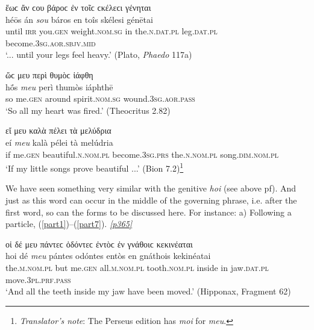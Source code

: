\begin{exe}
\ex ἕωϲ ἄν ϲου βάροϲ ἐν τοῖϲ ϲκέλεϲι γένηται\\
\gll héōs án \emph{sou} báros en toîs skélesi génētai\\
until \textsc{irr} you.\textsc{gen} weight.\textsc{nom.sg} in the.\textsc{n.dat.pl} leg.\textsc{dat.pl} become.\textsc{3sg.aor.sbjv.mid}\\
\trans `... until your legs feel heavy.' (Plato, \textit{Phaedo} 117a)
\label{gensep25}
\end{exe}

\begin{exe}
\ex ὥϲ μευ περὶ θυμὸϲ ἰάφθη\\
\gll hṓs \emph{meu} perì thumòs iáphthē\\
so me.\textsc{gen} around spirit.\textsc{nom.sg} wound.\textsc{3sg.aor.pass}\\
\trans `So all my heart was fired.' (Theocritus 2.82)
\label{gensep26}
\end{exe}

\begin{exe}
\ex εἴ μευ καλὰ πέλει τὰ μελύδρια\\
\gll eí \emph{meu} kalà pélei tà melúdria\\
if me.\textsc{gen} beautiful.\textsc{n.nom.pl} become.\textsc{3sg.prs}
the.\textsc{n.nom.pl} song.\textsc{dim.nom.pl}\\
\trans `If my little songs prove beautiful ...' (Bion 7.2)\footnote{\emph{Translator's note}: The Perseus edition has \textit{moi} for \textit{meu}.}
\label{gensep27}
\end{exe}

We have seen something very similar with the genitive \textit{hoi} (see above p\pageref{oi}f). And just as this word can occur in the middle of the governing phrase, i.e. after the first word, so can the forms to be discussed here. For instance: a) Following a particle, (\ref{part1})--(\ref{part7}). \hyperlink{p365}{\emph{[p365]}}

\begin{exe}
\ex οἱ δέ μευ πάντεϲ ὀδόντεϲ ἐντὸϲ ἐν γνάθοιϲ κεκινέαται\\
\gll hoi dé \emph{meu} pántes odóntes entòs en gnáthois kekinéatai\\
the.\textsc{m.nom.pl} but me.\textsc{gen} all.\textsc{m.nom.pl}
tooth.\textsc{nom.pl} inside in jaw.\textsc{dat.pl} move.\textsc{3pl.prf.pass}\\
\trans `And all the teeth inside my jaw have been moved.' (Hipponax, Fragment 62)
\label{part1}
\end{exe}


